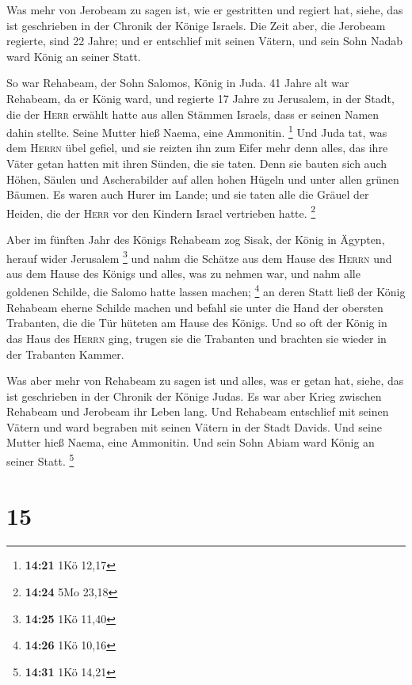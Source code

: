  Was mehr von Jerobeam zu sagen ist, wie er gestritten
und regiert hat, siehe, das ist geschrieben in der Chronik der Könige
Israels.  Die Zeit aber, die Jerobeam regierte, sind 22
Jahre; und er entschlief mit seinen Vätern, und sein Sohn Nadab ward
König an seiner Statt.

 So war Rehabeam, der Sohn Salomos, König in Juda. 41
Jahre alt war Rehabeam, da er König ward, und regierte 17 Jahre zu
Jerusalem, in der Stadt, die der \textsc{Herr} erwählt hatte aus allen
Stämmen Israels, dass er seinen Namen dahin stellte. Seine Mutter hieß
Naema, eine Ammonitin. \footnote{\textbf{14:21} 1Kö 12,17}
 Und Juda tat, was dem \textsc{Herrn} übel gefiel, und
sie reizten ihn zum Eifer mehr denn alles, das ihre Väter getan hatten
mit ihren Sünden, die sie taten.  Denn sie bauten sich
auch Höhen, Säulen und Ascherabilder auf allen hohen Hügeln und unter
allen grünen Bäumen.  Es waren auch Hurer im Lande; und
sie taten alle die Gräuel der Heiden, die der \textsc{Herr} vor den
Kindern Israel vertrieben hatte. \footnote{\textbf{14:24} 5Mo 23,18}

 Aber im fünften Jahr des Königs Rehabeam zog Sisak, der
König in Ägypten, herauf wider Jerusalem \footnote{\textbf{14:25} 1Kö
  11,40}  und nahm die Schätze aus dem Hause des
\textsc{Herrn} und aus dem Hause des Königs und alles, was zu nehmen
war, und nahm alle goldenen Schilde, die Salomo hatte lassen machen;
\footnote{\textbf{14:26} 1Kö 10,16}  an deren Statt ließ
der König Rehabeam eherne Schilde machen und befahl sie unter die Hand
der obersten Trabanten, die die Tür hüteten am Hause des Königs.
 Und so oft der König in das Haus des \textsc{Herrn}
ging, trugen sie die Trabanten und brachten sie wieder in der Trabanten
Kammer.

 Was aber mehr von Rehabeam zu sagen ist und alles, was
er getan hat, siehe, das ist geschrieben in der Chronik der Könige
Judas.  Es war aber Krieg zwischen Rehabeam und Jerobeam
ihr Leben lang.  Und Rehabeam entschlief mit seinen
Vätern und ward begraben mit seinen Vätern in der Stadt Davids. Und
seine Mutter hieß Naema, eine Ammonitin. Und sein Sohn Abiam ward König
an seiner Statt. \footnote{\textbf{14:31} 1Kö 14,21}

\hypertarget{section-4}{%
\section{15}\label{section-4}}

